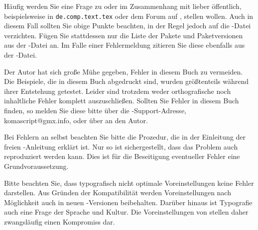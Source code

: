 {  Häufig werden Sie eine Frage zu \KOMAScript{} oder im Zusammenhang mit
  \KOMAScript{} lieber öffentlich, beispielsweise in \texttt{de.comp.text.tex}
  oder dem Forum auf \cite{homepage}, stellen wollen. Auch in diesem Fall
  sollten Sie obige Punkte beachten, in der Regel jedoch auf die
  -Datei verzichten. Fügen Sie stattdessen nur die Liste der Pakete
  und Paketversionen aus der -Datei an. Im Falle einer Fehlermeldung
  zitieren Sie diese ebenfalls aus der -Datei.%
}{%
  Der Autor hat sich große Mühe gegeben, Fehler in diesem Buch zu
  vermeiden. Die Beispiele, die in diesem Buch abgedruckt sind, wurden
  größtenteils während ihrer Entstehung getestet. Leider sind trotzdem weder
  orthografische noch inhaltliche Fehler komplett auszuschließen. Sollten Sie
  Fehler in diesem Buch finden, so melden Sie diese bitte über die
  \KOMAScript-Support-Adresse, \mbox{komascript@gmx.info}, oder über
  \cite{homepage} an den Autor.

  Bei Fehlern an \KOMAScript{} selbst beachten Sie bitte die Prozedur, die in
  der Einleitung der freien \KOMAScript-Anleitung erklärt ist. Nur so ist
  sichergestellt, dass das Problem auch reproduziert werden kann. Dies ist
  für die Beseitigung eventueller Fehler eine Grundvoraussetzung.%
}

Bitte beachten Sie, dass typografisch nicht optimale Voreinstellungen keine
Fehler darstellen. Aus Gründen der Kompatibilität werden Voreinstellungen nach
Möglichkeit auch in neuen \KOMAScript-Versionen beibehalten. Darüber hinaus
ist Typografie auch eine Frage der Sprache und Kultur. Die Voreinstellungen
von \KOMAScript{} stellen daher zwangsläufig einen Kompromiss dar.


\endinput

